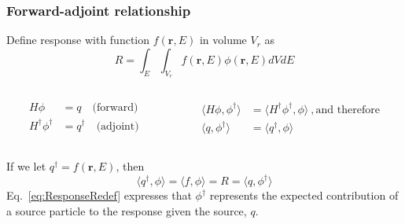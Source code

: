 \documentclass[xcolor=x11names,compress]{beamer}
\renewcommand{\(}{\begin{columns}}
\renewcommand{\)}{\end{columns}}
\newcommand{\<}[1]{\begin{column}{#1}}
\renewcommand{\>}{\end{column}}
\newcommand{\ve}[1]{\ensuremath{\mathbf{#1}}}
\begin{document}
\begin{frame}[fragile]
  \frametitle{Forward-adjoint relationship}
Define response with function $f(\ve{r}, E)$ in volume $V_r$ as
%
\begin{equation}
 R = \int_E \int_{V_r} f(\ve{r}, E) \phi(\ve{r}, E) dV dE 
 \label{eq:Response}
\end{equation}
%
\begin{columns}
  \begin{column}{0.5\textwidth}
	\begin{align}
  	H\phi &= q \quad \text{(forward)}\nonumber \\
  	H^{\dagger} \phi^{\dagger} &= q^{\dagger} \quad 
  	\text{(adjoint)}\nonumber
  	\end{align}
  \end{column}
  \begin{column}{0.5\textwidth}
  	\begin{align}
  	\langle H\phi, \phi^{\dagger} \rangle &= \langle H^{\dagger} \phi^{\dagger}, \phi \rangle \:, \text{and therefore} \nonumber \\
  	\langle q, \phi^{\dagger} \rangle &= \langle q^{\dagger}, \phi \rangle \nonumber
  	\end{align}
  \end{column}
\end{columns}
\vspace*{1 em}
\pause
If we let $q^{\dagger} = f(\ve{r}, E)$, then
%
\begin{equation}
 \langle q^{\dagger}, \phi \rangle = \langle f, \phi \rangle = R = \langle q, \phi^{\dagger} \rangle
 \label{eq:ResponseRedef}
\end{equation}
%
Eq.\ \eqref{eq:ResponseRedef} expresses that $\phi^{\dagger}$ represents the expected contribution of a source particle to the response given the source, $q$.

\end{frame}
\end{document}
